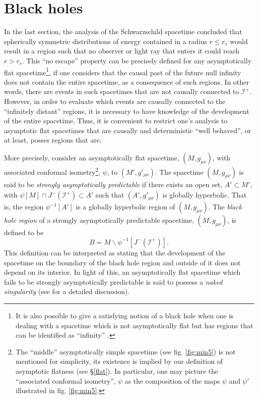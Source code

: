 \documentclass[
12pt,		%
openright,	%
twoside,  %
a4paper,			%
chapter=TITLE,		%
english,			%
french,				%
spanish,			%
brazil				%
]{USPSC-classe/USPSC}
\begin{document}
\section{Black holes}\label{bhsec}
In the last section, the analysis of the Schwarzschild spacetime concluded that spherically symmetric distributions of energy contained in a radius $r\leq r_s$ would result in a region such that no observer or light ray that enters it could reach $r>r_s$. This ``no escape'' property can be precisely defined for any asymptotically flat spacetime\footnote{It is also possible to give a satisfying notion of a black hole when one is dealing with a spacetime which is not asymptotically flat but has regions that can be identified as ``infinity'' \cite{Wald1984}.}, if one considers that the causal past of the future null infinity does not contain the entire spacetime, as a consequence of such regions. In other words, there are events in such spacetimes that are not causally connected to $\mathscr{I}^+$. However, in order to evaluate which events are causally connected to the ``infinitely distant'' regions, it is necessary to have knowledge of the development of the entire spacetime. Thus, it is convenient to restrict one's analysis to asymptotic flat spacetimes that are causally and deterministic ``well behaved'', or at least, posses regions that are.

More precisely, consider an asymptotically flat spacetime, $(M,g_{\mu\nu})$, with associated conformal isometry\footnote{The ``middle'' asymptotically simple spacetime (see fig. \ref{fig:min5}) is not mentioned for simplicity, its existence is implied by our definition of asymptotic flatness (see \S\;\ref{flat}). In particular, one may picture the ``associated conformal isometry'', $\psi$ as the composition of the maps $\psi$ and $\psi'$ illustrated in fig. \ref{fig:min5}.}, $\psi$, to $(M',g'_{\mu\nu})$. The spacetime $(M,g_{\mu\nu})$ is said to be \textit{strongly asymptotically predictable} if there exists an open set, $A'\subset M'$, with $\overline{\psi[M]\cap J^-(\mathscr{I^+})}\subset A'$ such that $(A',g'_{\mu\nu})$ is globally hyperbolic. That is, the region $\psi^{-1}[A']$ is a globally hyperbolic region of $(M,g_{\mu\nu})$. The \textit{black hole region} of a strongly asymptotically predictable spacetime, $(M,g_{\mu\nu})$, is defined to be 
\begin{equation}\label{blackhole}
    B=M\backslash \psi^{-1}[J^-(\mathscr{I}^+)].
\end{equation}
This definition can be interpreted as stating that the development of the spacetime on the boundary of the black hole region and outside of it does not depend on its interior. In light of this, an asymptotically flat spacetime which fails to be strongly asymptotically predictable is said to possess a \textit{naked singularity} (see \cite{Penrose1973} for a detailed discussion). 
\end{document}
